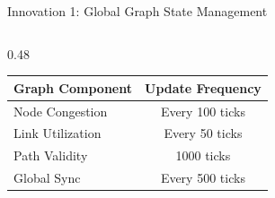 \documentclass[10pt,aspectratio=169]{beamer}
\begin{document}
\begin{frame}[fragile]{Innovation 1: Global Graph State Management}
\begin{columns}[T]
\begin{column}{0.48\textwidth}
            \begin{table}[h]
                \centering
                \tiny
                \begin{tabular}{|l|c|}
                    \hline
                    \textbf{Graph Component} & \textbf{Update Frequency} \\
                    \hline
                    Node Congestion & Every 100 ticks \\
                    Link Utilization & Every 50 ticks \\
                    Path Validity & 1000 ticks \\
                    Global Sync & Every 500 ticks \\
                    \hline
                \end{tabular}
            \end{table}
        \end{column}
    \end{columns}
\end{frame}
\end{document}

